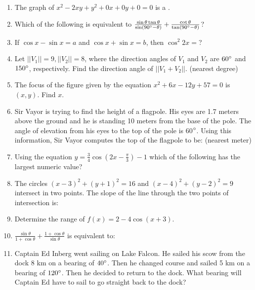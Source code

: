 \documentclass[../uilmath.tex]{subfiles}
\begin{document}
\begin{enumerate}[label=\bfseries\arabic*.]
    \item %
    The graph of $x^2-2xy+y^2+0x+0y+0=0$ is a \blank .

    \item %
    Which of the following is equivalent to $\frac{\sin\theta \tan\theta}{\sin(90\degree - \theta)}+\frac{\cot\theta}{\tan(90\degree-\theta)}$?

    \item %
    If $\cos x - \sin x = a$ and $\cos x + \sin x = b$, then $\cos^2 2x=$?

    \item %
    Let $||V_1||=9, ||V_2||=8$, where the direction angles of $V_1$ and $V_2$ are $60\degree$ and $150\degree$, respectively.
    Find the direction angle of $||V_1+V_2||$. (nearest degree)

    \item %
    The focus of the figure given by the equation $x^2+6x-12y+57=0$ is $(x,y)$. Find $x$.

    \item %
    Sir Vayor is trying to find the height of a flagpole. His eyes are 1.7 meters above the ground and he is standing 10 meters from the 
    base of the pole. The angle of elevation from his eyes to the top of the pole is 60$\degree$. Using this information, Sir Vayor computes the top of the flagpole to be: (nearest meter)

    \item %
    Using the equation $y=\frac{3}{4}\cos(2x-\frac{\pi}{3})-1$ which of the following has the largest numeric value?

    \item %
    The circles $(x-3)^2+(y+1)^2=16$ and $(x-4)^2+(y-2)^2=9$ intersect in two points. The slope of the line through the two points of intersection is:

    \item %
    Determine the range of $f(x)=2-4\cos(x+3)$.

    \item %
    $\frac{\sin\theta}{1+\cos\theta}+\frac{1+\cos\theta}{\sin\theta}$ is equivalent to:

    \item %
    Captain Ed Inberg went sailing on Lake Falcon. He sailed his scow from the dock 8 km on a bearing of $40\degree$. Then he changed course and sailed 5 km on a bearing of 
    $120\degree$. Then he decided to return to the dock. What bearing will Captain Ed have to sail to go straight back to the dock?


\end{enumerate}
\end{document}
